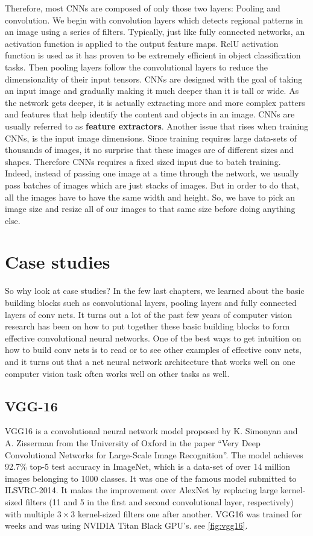 Therefore, most CNNs are composed of only those two layers: Pooling and convolution. We begin with convolution layers which detects regional patterns
in an image using a series of filters. Typically, just like fully connected networks, an activation function is applied to the output feature maps.
RelU activation function is used as it has proven to be extremely efficient in object classification tasks. Then pooling layers follow the
convolutional layers to reduce the dimensionality of their input tensors. CNNs are designed with the goal of taking an input image and gradually
making it much deeper than it is tall or wide. As the network gets deeper, it is actually extracting more and more complex patters and features that
help identify the content and objects in an image. CNNs are usually referred to as \textbf{feature extractors}. Another issue that rises when
training CNNs, is the input image dimensions. Since training requires large data-sets of thousands of images, it no surprise that these images
are of different sizes and shapes. Therefore CNNs requires a fixed sized input due to batch training. Indeed, instead of passing one image at a time
through the network, we usually pass batches of images which are just stacks of images. But in order to do that, all the images have to have the
same width and height. So, we have to pick an image size and resize all of our images to that same size before doing anything else.

\section{Case studies}

So why look at case studies? In the few last chapters, we learned about the basic building blocks such as convolutional layers, pooling layers and fully connected layers of conv nets. It turns out a lot of the past few years of computer vision research has been on how to put together these basic building blocks to form effective convolutional neural networks. One of the best ways to get intuition on how to build conv nets is to read or to see other examples of effective conv nets, and it turns out that a net neural network architecture that works well on one computer vision task often works well on other tasks as well.

\subsection{VGG-16}

VGG16 is a convolutional neural network model proposed by K. Simonyan and A. Zisserman from the University of Oxford in the paper “Very Deep Convolutional Networks for Large-Scale Image Recognition”. The model achieves 92.7\% top-5 test accuracy in ImageNet, which is a data-set of over 14 million images belonging to 1000 classes. It was one of the famous model submitted to ILSVRC-2014. It makes the improvement over AlexNet by replacing large kernel-sized filters (11 and 5 in the first and second convolutional layer, respectively) with multiple $3 \times 3$ kernel-sized filters one after another. VGG16 was trained for weeks and was using NVIDIA Titan Black GPU’s. see \cref{fig:vgg16}.

